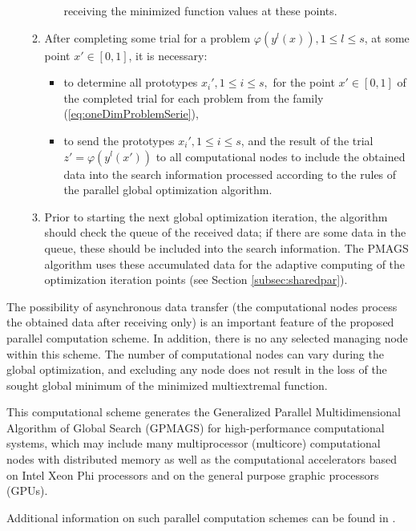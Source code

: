 \documentclass{aims}
\theoremstyle{definition}
\begin{document}
\begin{enumerate}
\begin{enumerate}
\begin{itemize}
      receiving the minimized function values at these points.
    \end{itemize}
    \item After completing some trial for a problem \(\varphi(y^l(x)),1\leq l\leq s\),
    at some point \(x'\in[0,1]\), it is necessary:
    \begin{itemize}
      \item to determine all prototypes \(x_i',1\leq i\leq s,\) for the point $x'\in[0,1]$ of the
      completed trial for each problem from the family (\ref{eq:oneDimProblemSerie}),
      \item to send the prototypes \(x_i',1\leq i\leq s\), and the result of the trial
      \(z'=\varphi(y^l(x'))\) to all computational nodes to include the obtained data into
      the search information processed according to the rules of the parallel global optimization algorithm.
    \end{itemize}
    \item Prior to starting the next global optimization iteration, the algorithm
    should check the queue of the received data; if there are some data in the queue,
    these should be included into the search information. The PMAGS algorithm uses these
    accumulated data for the adaptive computing of the optimization iteration points (see Section \ref{subsec:sharedpar}).
\end{enumerate}
\end{enumerate}
\par
The possibility of asynchronous data transfer (the computational nodes process the obtained
data after receiving only) is an important feature of the proposed parallel computation scheme.
In addition, there is no any selected managing node within this scheme. The number of
computational nodes can vary during the global optimization, and excluding any node does not result
in the loss of the sought global minimum of the minimized multiextremal function.
\par
This computational scheme generates the Generalized Parallel Multidimensional Algorithm of
Global Search (GPMAGS) for high-performance computational systems, which may include many
multiprocessor (multicore) computational nodes with distributed memory as well as the
computational accelerators based on Intel Xeon Phi processors and on the general purpose graphic processors (GPUs).
\par
Additional information on such parallel computation schemes can be found in \cite{gergelSidorov2015}.
\end{document}
